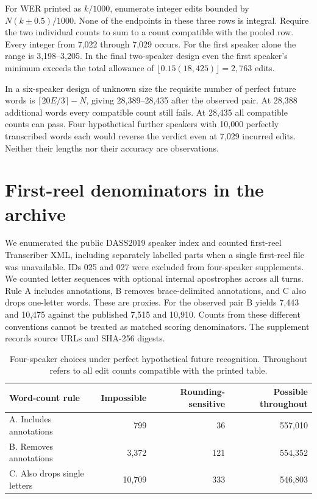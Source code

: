 \documentclass[11pt]{article}
\begin{document}
For WER printed as $k/1000$, enumerate integer edits bounded by $N(k\pm0.5)/1000$. None of the endpoints in these three rows is integral. Require the two individual counts to sum to a count compatible with the pooled row. Every integer from 7,022 through 7,029 occurs. For the first speaker alone the range is 3,198--3,205. In the final two-speaker design even the first speaker's minimum exceeds the total allowance of $\lfloor0.15(18{,}425)\rfloor=2{,}763$ edits.

In a six-speaker design of unknown size the requisite number of perfect future words is $\lceil20E/3\rceil-N$, giving 28,389--28,435 after the observed pair. At 28,388 additional words every compatible count still fails. At 28,435 all compatible counts can pass. Four hypothetical further speakers with 10,000 perfectly transcribed words each would reverse the verdict even at 7,029 incurred edits. Neither their lengths nor their accuracy are observations.
\section{First-reel denominators in the archive}
We enumerated the public DASS2019 speaker index \cite{archive} and counted first-reel Transcriber XML, including separately labelled parts when a single first-reel file was unavailable. IDs 025 and 027 were excluded from four-speaker supplements. We counted letter sequences with optional internal apostrophes across all turns. Rule A includes annotations, B removes brace-delimited annotations, and C also drops one-letter words. These are proxies. For the observed pair B yields 7,443 and 10,475 against the published 7,515 and 10,910. Counts from these different conventions cannot be treated as matched scoring denominators. The supplement records source URLs and SHA-256 digests.
\begin{table}[h]\centering\small
\begin{tabular}{lrrr}\toprule
Word-count rule & Impossible & Rounding-sensitive & Possible throughout\\\midrule
A. Includes annotations & 799 & 36 & 557,010\\
B. Removes annotations & 3,372 & 121 & 554,352\\
C. Also drops single letters & 10,709 & 333 & 546,803\\
\bottomrule\end{tabular}\caption{Four-speaker choices under perfect hypothetical future recognition. Throughout refers to all edit counts compatible with the printed table.}\end{table}
\end{document}
